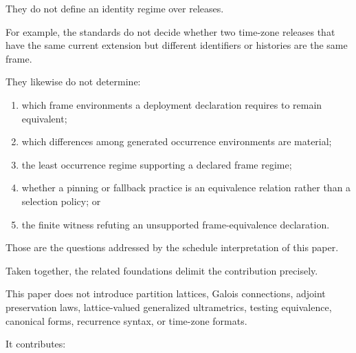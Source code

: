 \documentclass[11pt]{article}
\theoremstyle{plain}
\theoremstyle{definition}
\theoremstyle{remark}
\begin{document}
They do not define
an identity regime over releases.

For example,
the standards do not decide
whether two time-zone releases
that have the same current extension
but different identifiers or histories
are the same frame.

They likewise do not determine:

\begin{enumerate}[label=(\alph*)]
  \item which frame environments
        a deployment declaration requires
        to remain equivalent;
  \item which differences
        among generated occurrence environments
        are material;
  \item the least occurrence regime
        supporting a declared frame regime;
  \item whether a pinning
        or fallback practice
        is an equivalence relation
        rather than a selection policy; or
  \item the finite witness
        refuting an unsupported
        frame-equivalence declaration.
\end{enumerate}

Those are the questions
addressed by the schedule interpretation
of this paper.

Taken together,
the related foundations delimit
the contribution precisely.

This paper does not introduce
partition lattices,
Galois connections,
adjoint preservation laws,
lattice-valued generalized ultrametrics,
testing equivalence,
canonical forms,
recurrence syntax,
or time-zone formats.

It contributes:
\end{document}
